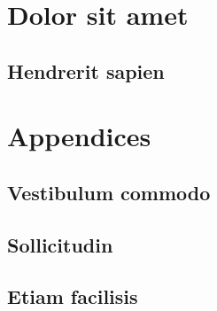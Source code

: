 \part{Dolor sit amet}
\newpage
\chapter{Hendrerit sapien} \label{ch:hendrerit}

\newpage


\part{Appendices}
\newpage
\chapter{Vestibulum commodo} \label{ch:commodo}

\newpage
\chapter{Sollicitudin} \label{ch:sollicitudin}

\newpage
\chapter{Etiam facilisis} \label{ch:etiam}

\newpage
\listoffigures
\listoftables


